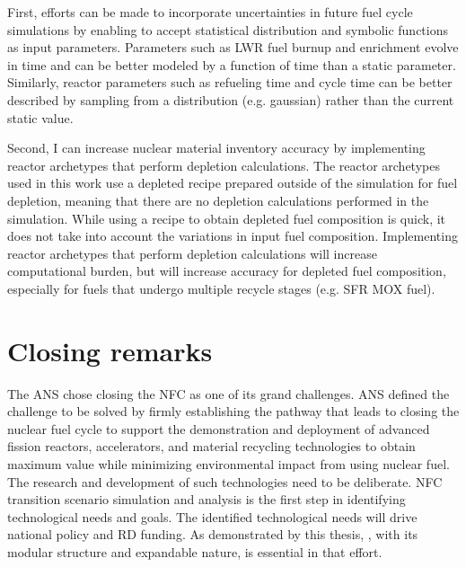First, efforts can be made to incorporate
uncertainties in future fuel cycle simulations by enabling
\Cyclus to accept statistical distribution and symbolic
functions as input parameters. Parameters such as \gls{LWR} fuel
burnup and enrichment evolve in time and can be better modeled
by a function of time than a static parameter. Similarly, reactor parameters
such as refueling time and cycle time can be better described by sampling
from a distribution (e.g. gaussian) rather than the current static
value.

Second, I can increase nuclear material inventory accuracy by
implementing reactor archetypes that perform depletion calculations.
The reactor archetypes used in this work use a depleted recipe
prepared outside of the simulation for fuel depletion, meaning
that there are no depletion calculations performed in the simulation.
While using a recipe to obtain depleted fuel composition is quick,
it does not take into account the variations in input fuel composition.
Implementing reactor archetypes that perform depletion calculations will
increase computational burden, but will increase accuracy for depleted
fuel composition, especially for fuels that undergo multiple recycle
stages (e.g. \gls{SFR} \gls{MOX} fuel).


\section{Closing remarks}
The \gls{ANS} chose closing the \gls{NFC} as one of its grand challenges. \gls{ANS}
defined the challenge to be solved by firmly establishing the pathway that leads to closing
the nuclear fuel cycle to support the demonstration and deployment of
advanced fission reactors, accelerators, and material recycling technologies
to obtain maximum value while minimizing environmental impact 
from using nuclear fuel. The research and development of such technologies
need to be deliberate. \gls{NFC} transition scenario simulation and 
analysis is the first step in identifying technological needs
and goals. The identified technological needs will drive national
policy and \gls{RD} funding. As demonstrated by this thesis, \Cyclus, with its modular structure and expandable nature, is essential in that effort.

